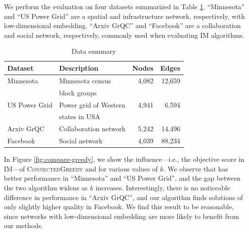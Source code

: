 We perform the evaluation on four datasets summarized in Table \ref{table:datasets}. ``Minnesota'' and ``US Power Grid'' are a spatial and infrastructure network, respectively, with low-dimensional embedding. ``Arxiv GrQC'' and ``Facebook'' are a collaboration and social network, respectively, commonly used when evaluating IM algorithms.

\label{sec:compare-to-greedy}
\begin{table}[ht]
\centering \caption{Data summary}
\label{table:datasets}
\vspace{-.15in}
\begin{tabular}{|l|l|r|r|}
\hline
\textbf{Dataset}  & \textbf{Description} & \textbf{Nodes} & \textbf{Edges} \\
\hline
Minnesota  & Minnesota census & 4,082 & 12,659 \\
& block groups & & \\
\hline
US Power Grid & Power grid of Western  & 4,941 & 6,594\\
& states in USA & & \\
\hline
Arxiv GrQC & Collaboration network & 5,242 & 14,496 \\
\hline
Facebook  & Social network & 4,039 & 88,234\\
\hline
\end{tabular}
\end{table}

In Figure \ref{fig:compare-greedy}, we show the influence---i.e., the objective score in IM---of \textsc{ConnectedGreedy} and \algomaxcrit{} for various values of $k$. We observe that \algomaxcrit{} has better performance in ``Minnesota'' and ``US Power Grid'', and the gap between the two algorithm widens as $k$ increases. Interestingly, there is no noticeable difference in performance in ``Arxiv GrQC'', and our algorithm finds solutions of only slightly higher quality in Facebook. We find this result to be reasonable, since networks with low-dimensional embedding are more likely to benefit from our methods.

